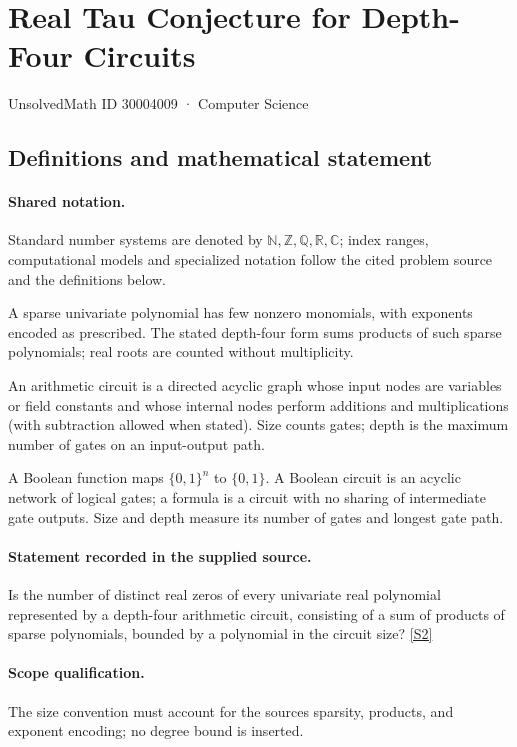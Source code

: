 \documentclass[11pt]{article}
\newcommand{\sref}[2]{\hyperlink{source:#1:#2}{[S#2]}}
\begin{document}
\setcounter{section}{30004008}
\section{Real Tau Conjecture for Depth-Four Circuits}\label{30004009}
{\small\sffamily UnsolvedMath ID 30004009 · Computer Science}
\subsection{Definitions and mathematical statement}

\paragraph{Shared notation.}Standard number systems are denoted by $\mathbb N,\mathbb Z,\mathbb Q,\mathbb R,\mathbb C$; index ranges, computational models and specialized notation follow the cited problem source and the definitions below.


A sparse univariate polynomial has few nonzero monomials, with exponents encoded as prescribed. The stated depth-four form sums products of such sparse polynomials; real roots are counted without multiplicity.

An arithmetic circuit is a directed acyclic graph whose input nodes are variables or field constants and whose internal nodes perform additions and multiplications (with subtraction allowed when stated). Size counts gates; depth is the maximum number of gates on an input-output path.

A Boolean function maps $\{0,1\}^n$ to $\{0,1\}$. A Boolean circuit is an acyclic network of logical gates; a formula is a circuit with no sharing of intermediate gate outputs. Size and depth measure its number of gates and longest gate path.
\paragraph{Statement recorded in the supplied source.}
Is the number of distinct real zeros of every univariate real polynomial represented by a depth-four arithmetic circuit, consisting of a sum of products of sparse polynomials, bounded by a polynomial in the circuit size? \sref{30004009}{2}
\paragraph{Scope qualification.}
The size convention must account for the source\textquotesingle s sparsity, products, and exponent encoding; no degree bound is inserted.
\end{document}
